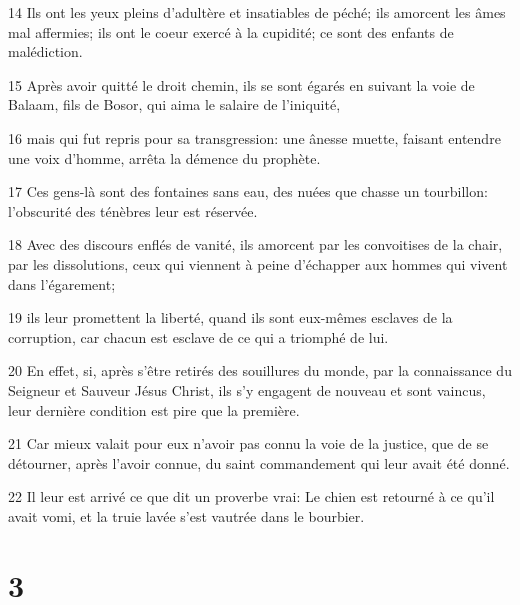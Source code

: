 \par 14 Ils ont les yeux pleins d'adultère et insatiables de péché; ils amorcent les âmes mal affermies; ils ont le coeur exercé à la cupidité; ce sont des enfants de malédiction.
\par 15 Après avoir quitté le droit chemin, ils se sont égarés en suivant la voie de Balaam, fils de Bosor, qui aima le salaire de l'iniquité,
\par 16 mais qui fut repris pour sa transgression: une ânesse muette, faisant entendre une voix d'homme, arrêta la démence du prophète.
\par 17 Ces gens-là sont des fontaines sans eau, des nuées que chasse un tourbillon: l'obscurité des ténèbres leur est réservée.
\par 18 Avec des discours enflés de vanité, ils amorcent par les convoitises de la chair, par les dissolutions, ceux qui viennent à peine d'échapper aux hommes qui vivent dans l'égarement;
\par 19 ils leur promettent la liberté, quand ils sont eux-mêmes esclaves de la corruption, car chacun est esclave de ce qui a triomphé de lui.
\par 20 En effet, si, après s'être retirés des souillures du monde, par la connaissance du Seigneur et Sauveur Jésus Christ, ils s'y engagent de nouveau et sont vaincus, leur dernière condition est pire que la première.
\par 21 Car mieux valait pour eux n'avoir pas connu la voie de la justice, que de se détourner, après l'avoir connue, du saint commandement qui leur avait été donné.
\par 22 Il leur est arrivé ce que dit un proverbe vrai: Le chien est retourné à ce qu'il avait vomi, et la truie lavée s'est vautrée dans le bourbier.

\chapter{3}

